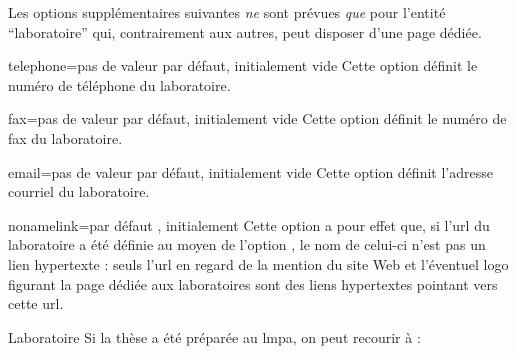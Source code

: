 Les options supplémentaires suivantes \emph{ne} sont prévues
\emph{que} pour l'entité \enquote{laboratoire} qui, contrairement
aux autres, peut disposer d'une page dédiée\pagededieelabo.
%
\begin{docKey}{telephone}{=}{pas de valeur par défaut,
    initialement vide}
  Cette option définit le numéro de téléphone du laboratoire.
\end{docKey}
%
\begin{docKey}{fax}{=}{pas de valeur par défaut,
    initialement vide}
  Cette option définit le numéro de fax du laboratoire.
\end{docKey}
%
\begin{docKey}{email}{=}{pas de valeur par
    défaut, initialement vide}
  Cette option définit l'adresse courriel du laboratoire.
\end{docKey}
%
\begin{docKey}{nonamelink}{=\textbar{}}{par défaut
    , initialement }
%
  Cette option a pour effet que, si l'\acrshort{url} du laboratoire a été
  définie au moyen de l'option , le nom de celui-ci n'est pas un
  lien hypertexte : seuls l'\acrshort{url} en regard de la mention du site Web
  et l'éventuel logo figurant la page dédiée aux laboratoires\pagededieelabo{}
  sont des liens hypertextes pointant vers cette \acrshort{url}.
\end{docKey}
%
\begin{dbexample}{Laboratoire}{}
  Si la thèse a été préparée au \gls{lmpa}, on peut recourir à :
  \NoAutoSpacing%
\begin{preamblecode}[listing options={deletekeywords={url}}]
\end{preamblecode}
\end{dbexample}
